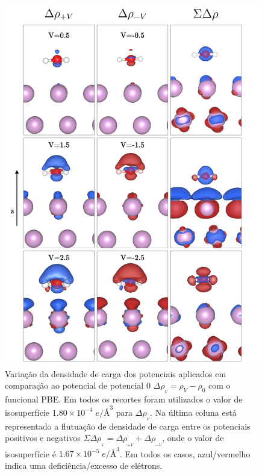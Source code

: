 \begin{figure}[t!]
	\centering
	\caption{Variação da densidade de carga dos potenciais aplicados em comparação ao potencial de potencial 0 $ \Delta\rho_{_ {V}}=\rho_{V}-\rho_{0} $ com o funcional PBE. Em todos os recortes foram utilizados o valor de isosuperfície $ 1.80\times10^{-4}\;\si{e}/\si{\angstrom}^3  $ para $ \Delta\rho_{_ {V}} $. Na última coluna está representado a flutuação de densidade de carga entre os potenciais positivos e negativos $ \Sigma\Delta\rho_{_ {V}}=\Delta\rho_{ _{+V}}+\Delta\rho_{ _{-V}} $, onde o valor de isosuperfície é $ 1.67\times10^{-5} \;\si{e}/\si{\angstrom}^3 $. Em todos os casos, azul/vermelho indica uma deficiência/excesso de elétrons.}
	\label{fig:pd_densidade}
	\includegraphics[scale=0.068]{figs/pd_densidade2.png}
\end{figure}

